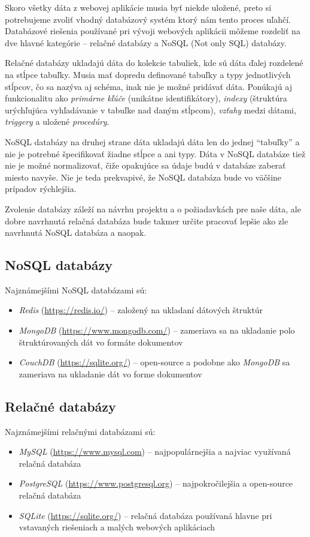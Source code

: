 Skoro všetky dáta z webovej aplikácie musia byť niekde uložené, preto si potrebujeme zvoliť vhodný databázový systém ktorý nám tento proces uľahčí. Databázové riešenia používané pri vývoji webových aplikácii môžeme rozdeliť na dve hlavné kategórie -- relačné databázy a NoSQL (Not only SQL) databázy.

Relačné databázy ukladajú dáta do kolekcie tabuliek, kde sú dáta ďalej rozdelené na stĺpce tabuľky. Musia mať dopredu definované tabuľky a typy jednotlivých stĺpcov, čo sa nazýva aj schéma, inak nie je možné pridávať dáta. Ponúkajú aj funkcionalitu ako \emph{primárne kľúče} (unikátne identifikátory), \emph{indexy} (štruktúra urýchľujúca vyhľadávanie v tabuľke nad daným stĺpcom), \emph{vzťahy} medzi dátami, \emph{triggery} a uložené \emph{procedúry}.

NoSQL databázy na druhej strane dáta ukladajú dáta len do jednej ``tabuľky'' a nie je potrebné špecifikovať žiadne stĺpce a ani typy. Dáta v NoSQL databáze tiež nie je možné normalizovať, čiže opakujúce sa údaje budú v databáze zaberať miesto navyše. Nie je teda prekvapivé, že NoSQL databáza bude vo väčšine prípadov rýchlejšia.

Zvolenie databázy záleží na návrhu projektu a o požiadavkách pre naše dáta, ale dobre navrhnutá relačná databáza bude takmer určite pracovať lepšie ako zle navrhnutá NoSQL databáza a naopak.

\subsection*{NoSQL databázy}

Najznámejšími NoSQL databázami sú:

\begin{itemize}
    \item \emph{Redis} (\url{https://redis.io/}) -- založený na ukladaní dátových štruktúr
    \item \emph{MongoDB} (\url{https://www.mongodb.com/}) -- zameriava sa na ukladanie polo štruktúrovaných dát vo formáte dokumentov
    \item \emph{CouchDB}  (\url{https://sqlite.org/}) -- open-source a podobne ako \emph{MongoDB} sa zameriava na ukladanie dát vo forme dokumentov
\end{itemize}

\subsection*{Relačné databázy}

Najznámejšími relačnými databázami sú:

\begin{itemize}
    \item \emph{MySQL} (\url{https://www.mysql.com}) --  najpopulárnejšia a najviac využívaná relačná databáza
    \item \emph{PostgreSQL} (\url{https://www.postgresql.org}) -- najpokročilejšia a open-source relačná databáza
    \item \emph{SQLite}  (\url{https://sqlite.org/}) -- relačná databáza používaná hlavne pri vstavaných riešeniach a malých webových aplikáciach
\end{itemize}